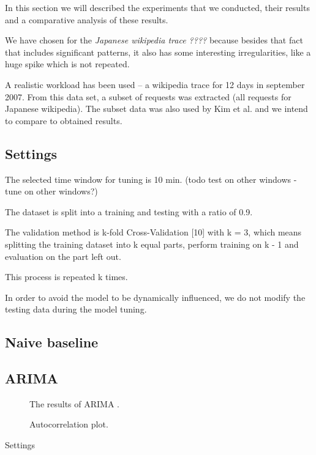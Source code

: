 
In this section we will described the experiments that we conducted, their results and a comparative analysis of these results.

We have chosen for 
the {\em Japanese wikipedia trace ????} because besides that fact that includes significant patterns, it also has some interesting irregularities, like a huge spike which is not repeated. 

A realistic workload has been used -- a wikipedia trace for 12 days
in september 2007. From this data set, a subset of requests was extracted (all requests for Japanese
wikipedia). The subset data was also used by Kim et al. \cite{KWQH18} and we intend to compare to obtained results. 



\subsection{Settings}
The selected time window for tuning is 10 min. (todo test on other
windows - tune on other windows?)

The dataset is split into a training and testing with a ratio of 0.9. 

The validation
method is k-fold Cross-Validation [10] with k = 3, which means splitting the training
dataset into k equal parts, perform training on k - 1 and evaluation on the part left out.

This process is repeated k times. 

In order to avoid  the model to be dynamically influenced, we do not modify the testing data during the model tuning.

\subsection{Naive baseline}

\subsection{ARIMA}


	\begin{figure}
	\centering{
		\texttt{[image: ]}
	}
	\caption{The results of ARIMA .}
	\label{fig:arima1}
\end{figure}

	\begin{figure}
	\centering{
		\texttt{[image: ]}
	}
	\caption{Autocorrelation plot.}
	\label{fig:arima2}
\end{figure}
Settings

